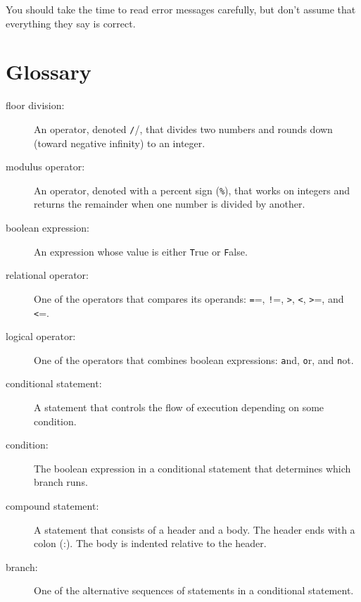 \documentclass[
DIV=11,
fontsize=13,
twoside,
headinclude=false,
titlepage=firstiscover,
abstract=true,
headsepline=true,
footsepline=true,
chapterprefix=true, %
headings=big,
bibliography=totoc,%
captions=tableheading
]{scrbook}
\theoremstyle{definition}
\begin{document}
You should take the time to read error messages carefully, but don't
assume that everything they say is correct.


\section{Glossary}

\begin{description}

\item[floor division:] An operator, denoted {\texttt //}, that divides two
  numbers and rounds down (toward negative infinity) to an integer.

\item[modulus operator:]  An operator, denoted with a percent sign
({\texttt \%}), that works on integers and returns the remainder when one
number is divided by another.

\item[boolean expression:]  An expression whose value is either 
{\texttt True} or {\texttt False}.

\item[relational operator:] One of the operators that compares
its operands: {\texttt ==}, {\texttt !=}, {\texttt >}, {\texttt <}, {\texttt >=}, and {\texttt <=}.

\item[logical operator:] One of the operators that combines boolean
expressions: {\texttt and}, {\texttt or}, and {\texttt not}.

\item[conditional statement:]  A statement that controls the flow of
execution depending on some condition.

\item[condition:] The boolean expression in a conditional statement
that determines which branch runs.

\item[compound statement:]  A statement that consists of a header
and a body.  The header ends with a colon (:).  The body is indented
relative to the header.

\item[branch:] One of the alternative sequences of statements in
a conditional statement.


\end{description}
\end{document}
